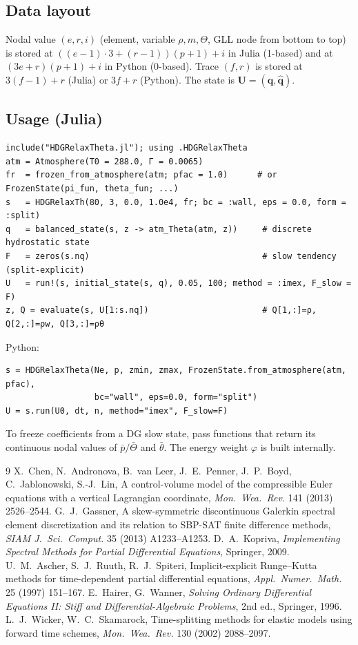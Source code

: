 \documentclass[11pt,a4paper]{article}
\newcommand{\qh}{\hat{\bm q}}
\newcommand{\q}{\bm q}
\newcommand{\thb}{\bar\theta}
\begin{document}
\subsection*{Data layout}
Nodal value $(e,r,i)$ (element, variable $\rho,m,\Theta$, GLL node from bottom to top) is stored
at $((e-1)\cdot3+(r-1))(p+1)+i$ in Julia (1-based) and at $(3e+r)(p+1)+i$ in Python (0-based).
Trace $(f,r)$ is stored at $3(f-1)+r$ (Julia) or $3f+r$ (Python). The state is $\bm U=(\q,\qh)$.

\subsection*{Usage (Julia)}
\begin{lstlisting}
include("HDGRelaxTheta.jl"); using .HDGRelaxTheta
atm = Atmosphere(T0 = 288.0, Γ = 0.0065)
fr  = frozen_from_atmosphere(atm; pfac = 1.0)      # or FrozenState(pi_fun, theta_fun; ...)
s   = HDGRelaxTh(80, 3, 0.0, 1.0e4, fr; bc = :wall, eps = 0.0, form = :split)
q   = balanced_state(s, z -> atm_Theta(atm, z))     # discrete hydrostatic state
F   = zeros(s.nq)                                   # slow tendency (split-explicit)
U   = run!(s, initial_state(s, q), 0.05, 100; method = :imex, F_slow = F)
z, Q = evaluate(s, U[1:s.nq])                       # Q[1,:]=ρ, Q[2,:]=ρw, Q[3,:]=ρθ
\end{lstlisting}
Python:
\begin{lstlisting}
s = HDGRelaxTheta(Ne, p, zmin, zmax, FrozenState.from_atmosphere(atm, pfac),
                  bc="wall", eps=0.0, form="split")
U = s.run(U0, dt, n, method="imex", F_slow=F)
\end{lstlisting}
To freeze coefficients from a DG slow state, pass functions that return its continuous nodal
values of $\bar p/\bar\Theta$ and $\thb$. The energy weight $\varphi$ is built internally.

\begin{thebibliography}{9}
 X.~Chen, N.~Andronova, B.~van Leer, J.~E.~Penner, J.~P.~Boyd, C.~Jablonowski,
S.-J.~Lin, A control-volume model of the compressible Euler equations with a vertical Lagrangian
coordinate, \emph{Mon.\ Wea.\ Rev.} 141 (2013) 2526--2544.
 G.~J.~Gassner, A skew-symmetric discontinuous Galerkin spectral element
discretization and its relation to SBP-SAT finite difference methods, \emph{SIAM J.\ Sci.\
Comput.} 35 (2013) A1233--A1253.
 D.~A.~Kopriva, \emph{Implementing Spectral Methods for Partial Differential
Equations}, Springer, 2009.
 U.~M.~Ascher, S.~J.~Ruuth, R.~J.~Spiteri, Implicit-explicit Runge--Kutta methods for
time-dependent partial differential equations, \emph{Appl.\ Numer.\ Math.} 25 (1997) 151--167.
\bibitem{hairer} E.~Hairer, G.~Wanner, \emph{Solving Ordinary Differential Equations II: Stiff and
Differential-Algebraic Problems}, 2nd ed., Springer, 1996.
 L.~J.~Wicker, W.~C.~Skamarock, Time-splitting methods for elastic models using
forward time schemes, \emph{Mon.\ Wea.\ Rev.} 130 (2002) 2088--2097.
\end{thebibliography}
\end{document}
